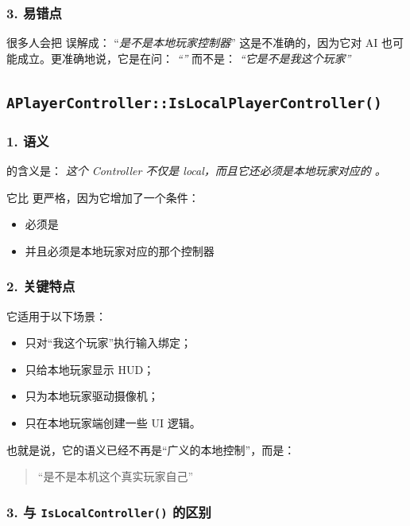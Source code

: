 \subsubsection*{3. 易错点}

很多人会把  误解成：
“\emph{是不是本地玩家控制器}”
这是不准确的，因为它对 AI 也可能成立。更准确地说，它是在问：
\emph{“”}
而不是：
\emph{“它是不是我这个玩家”}

\subsection{\texttt{APlayerController::IsLocalPlayerController()}}

\subsubsection*{1. 语义}

 的含义是：
\emph{这个 Controller 不仅是 local，而且它还必须是本地玩家对应的 。}

它比  更严格，因为它增加了一个条件：
\begin{itemize}
	\item 必须是 
	\item 并且必须是本地玩家对应的那个控制器
\end{itemize}

\subsubsection*{2. 关键特点}

它适用于以下场景：

\begin{itemize}
	\item 只对“我这个玩家”执行输入绑定；
	\item 只给本地玩家显示 HUD；
	\item 只为本地玩家驱动摄像机；
	\item 只在本地玩家端创建一些 UI 逻辑。
\end{itemize}

也就是说，它的语义已经不再是“广义的本地控制”，而是：

\begin{quote}
	“是不是本机这个真实玩家自己”
\end{quote}

\subsubsection*{3. 与 \texttt{IsLocalController()} 的区别}

